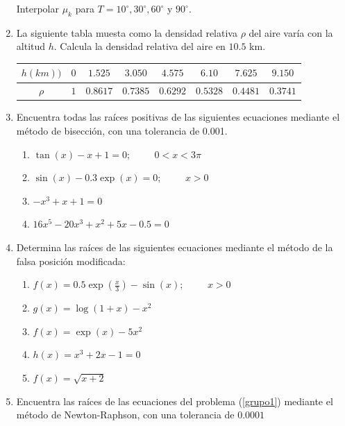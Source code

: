 \documentclass[11pt]{article}
\renewcommand{\arraystretch}{1.5}
\begin{document}
\begin{enumerate}
\begin{table}[H]
\begin{large}
			\end{large}
	\end{table}
	Interpolar $\mu_{k}$ para $T= 10^{\circ},30^{\circ},60^{\circ}$ y $90^{\circ}$.
	\item La siguiente tabla muesta como la densidad relativa $\rho$ del aire varía con la altitud $h$. Calcula la densidad relativa del aire en $10.5$ km.
	\begin{table}[H]
		\centering 
		\begin{large}
			\begin{tabulary}{15cm}{c | c | c | c | c | c | c | c }
				$h(km))$ & $0$ & $1.525$ & $3.050$ & $4.575$ & $6.10$ & $7.625$ & $9.150$ \\
				\midrule
				$\rho$ & $1$ & $0.8617$ & $0.7385$ & $0.6292$ & $0.5328$ & $0.4481$ & $0.3741$ 
			\end{tabulary}
		\end{large}
	\end{table}
\newpage
	\item Encuentra todas las raíces positivas de las siguientes ecuaciones mediante el método de bisección, con una tolerancia de 0.001.
	\begin{enumerate}\label{grupo1}
	\renewcommand{\arraystretch}{1.5}
		\item $\tan(x) - x + 1 = 0; \hspace{1cm} 0 < x < 3\pi$
		\item $\sin(x) - 0.3 \exp(x) = 0; \hspace{1cm} x > 0$
		\item $-x^{3} + x + 1 = 0$
		\item $16x^{5} - 20x^{3} + x^{2} + 5x - 0.5 = 0$
	\end{enumerate}
	\item Determina las raíces de las siguientes ecuaciones mediante el método de la falsa posición modificada:
	\begin{enumerate}
		\renewcommand{\arraystretch}{1.5}
		\item $f(x) = 0.5\exp(\frac{x}{3})- \sin(x); \hspace{1cm} x > 0$
		\item $g(x) = \log(1 + x) - x^{2}$
		\item $f(x) = \exp(x) - 5x^{2}$
		\item $h(x) = x^{3} + 2x - 1 = 0$
		\item $f(x) = \sqrt{x+2}$
	\end{enumerate}
	\item Encuentra las raíces de las ecuaciones del problema (\ref{grupo1}) mediante el método de Newton-Raphson, con una tolerancia de $0.0001$

\end{enumerate}
\end{document}
